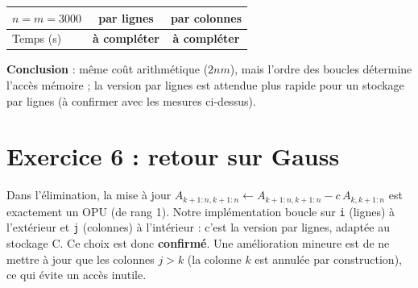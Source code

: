 \documentclass[10pt,a4paper]{article}
\begin{document}
\begin{center}
\begin{tabular}{lcc}
\toprule
$n=m=3000$ & par lignes & par colonnes\\
\midrule
Temps (s) & \textbf{à compléter} & \textbf{à compléter}\\
\bottomrule
\end{tabular}
\end{center}
\textbf{Conclusion} : même coût arithmétique ($2nm$), mais l'ordre des boucles
détermine l'accès mémoire ; la version par lignes est attendue plus rapide pour
un stockage par lignes (à confirmer avec les mesures ci-dessus).

\section*{Exercice 6 : retour sur Gauss}
Dans l'élimination, la mise à jour $A_{k+1:n,k+1:n}\leftarrow A_{k+1:n,k+1:n}-c\,A_{k,k+1:n}$
est exactement un OPU (de rang 1). Notre implémentation boucle sur \texttt{i}
(lignes) à l'extérieur et \texttt{j} (colonnes) à l'intérieur : c'est la version
par lignes, adaptée au stockage C. Ce choix est donc \textbf{confirmé}. Une
amélioration mineure est de ne mettre à jour que les colonnes $j>k$ (la colonne $k$
est annulée par construction), ce qui évite un accès inutile.
\end{document}
